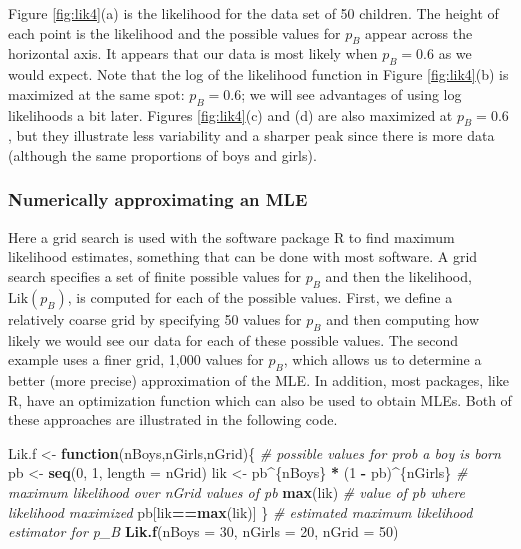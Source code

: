 \documentclass[
]{krantz}
\newenvironment{Shaded}{\begin{snugshade}}{\end{snugshade}}
\newcommand{\CommentTok}[1]{\textcolor[rgb]{0.37,0.37,0.37}{\textit{#1}}}
\newcommand{\ControlFlowTok}[1]{\textcolor[rgb]{0.27,0.27,0.27}{\textbf{#1}}}
\newcommand{\DataTypeTok}[1]{\textcolor[rgb]{0.27,0.27,0.27}{#1}}
\newcommand{\DecValTok}[1]{\textcolor[rgb]{0.06,0.06,0.06}{#1}}
\newcommand{\KeywordTok}[1]{\textcolor[rgb]{0.27,0.27,0.27}{\textbf{#1}}}
\newcommand{\NormalTok}[1]{#1}
\newcommand{\OperatorTok}[1]{\textcolor[rgb]{0.43,0.43,0.43}{\textbf{#1}}}
\newcommand{\StringTok}[1]{\textcolor[rgb]{0.5,0.5,0.5}{#1}}
\newcommand{\Lik}{\mathrm{Lik}}
\begin{document}
Figure \ref{fig:lik4}(a) is the likelihood for the data set of 50 children. The height of each point is the likelihood and the possible values for \(p_B\) appear across the horizontal axis. It appears that our data is most likely when \(p_B = 0.6\) as we would expect. Note that the log of the likelihood function in Figure \ref{fig:lik4}(b) is maximized at the same spot: \(p_B = 0.6\); we will see advantages of using log likelihoods a bit later. Figures \ref{fig:lik4}(c) and (d) are also maximized at \(p_B = 0.6\), but they illustrate less variability and a sharper peak since there is more data (although the same proportions of boys and girls).

\hypertarget{numerically-approximating-an-mle}{%
\subsubsection{Numerically approximating an MLE}\label{numerically-approximating-an-mle}}

Here a grid search is used with the software package R to find maximum likelihood estimates, something that can be done with most software. A grid search specifies a set of finite possible values for \(p_B\) and then the likelihood, \(\Lik(p_B)\), is computed for each of the possible values. First, we define a relatively coarse grid by specifying 50 values for \(p_B\) and then computing how likely we would see our data for each of these possible values. The second example uses a finer grid, 1,000 values for \(p_B\), which allows us to determine a better (more precise) approximation of the MLE. In addition, most packages, like R, have an optimization function which can also be used to obtain MLEs. Both of these approaches are illustrated in the following code.

\begin{Shaded}
\begin{Highlighting}[]
\NormalTok{Lik.f <-}\StringTok{ }\ControlFlowTok{function}\NormalTok{(nBoys,nGirls,nGrid)\{}
    \CommentTok{# possible values for prob a boy is born}
\NormalTok{    pb <-}\StringTok{ }\KeywordTok{seq}\NormalTok{(}\DecValTok{0}\NormalTok{, }\DecValTok{1}\NormalTok{, }\DataTypeTok{length =}\NormalTok{ nGrid)   }
\NormalTok{    lik <-}\StringTok{ }\NormalTok{pb}\OperatorTok{^}\NormalTok{\{nBoys\} }\OperatorTok{*}\StringTok{ }\NormalTok{(}\DecValTok{1} \OperatorTok{-}\StringTok{ }\NormalTok{pb)}\OperatorTok{^}\NormalTok{\{nGirls\}}
    \CommentTok{# maximum likelihood over nGrid values of pb}
    \KeywordTok{max}\NormalTok{(lik)             }
    \CommentTok{# value of pb where likelihood maximized}
\NormalTok{    pb[lik}\OperatorTok{==}\KeywordTok{max}\NormalTok{(lik)]    }
\NormalTok{  \}}
\CommentTok{# estimated maximum likelihood estimator for p_B}
\KeywordTok{Lik.f}\NormalTok{(}\DataTypeTok{nBoys =} \DecValTok{30}\NormalTok{, }\DataTypeTok{nGirls =} \DecValTok{20}\NormalTok{, }\DataTypeTok{nGrid =} \DecValTok{50}\NormalTok{) }
\end{Highlighting}
\end{Shaded}
\end{document}
